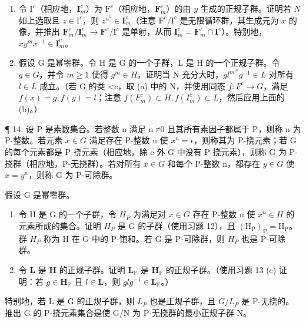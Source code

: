 \begin{enumerate}
\def\labelenumi{(\alph{enumi})}
\setcounter{enumi}{1}
\item
  令 \(\mathrm{I}^c\)（相应地，\(\mathbf{I}_m^c\)）为 \(\mathrm{F}^c\)（相应地，\(\mathbf{F}_m^c\)）的由 \(y\) 生成的正规子群。证明若 \(N\) 如上选取且 \(z \in \mathrm{I}^c\)，则 \(z^{n^k} \in \mathbf{I}_m^c\)（注意 \(\mathrm{F}^c / \mathrm{I}^c\) 是无限循环群，其生成元为 \(x\) 的像，并推出 \(\mathbf{F}_m^c / \mathbf{I}_m^c \to \mathbf{F}^c / \mathrm{I}^c\) 是单射，从而 \(\mathbf{I}_m^c = \mathbf{F}_m^c \cap \mathbf{I}^c\)）。特别地，\(xy^m x^{-1} \in \mathbf{I}_m^c\)。
\item
  假设 G 是幂零群。令 H 是 G 的一个子群，L 是 H 的一个正规子群。令 \(g \in G\)，并令 \(m \geqslant 1\) 使得 \(g^{m} \in H\)。证明当 N 充分大时，\(gl^{m^{N}} g^{-1} \in L\) 对所有 \(l \in L\) 成立。（若 G 的类 \textless c，取 (a) 中的 N，并使用同态 \(f: F^{c} \to G\)，满足 \(f(x) = g, f(y) = l\)；注意 \(f(F_{m}^{c}) \subset H, f(I_{m}^{c}) \subset L\)，然后应用上面的 (b)。）
\end{enumerate}

¶ 14. 设 P 是素数集合。若整数 n 满足 n ≠0 且其所有素因子都属于 P，则称 n 为 P-整数。若元素 \(x \in G\) 满足存在 P-整数 n 使 \(x^{n} = \epsilon\)，则称其为 P-挠元素；若 G 的每个元素都是 P-挠元素（相应地，除 e 外 G 中没有 P-挠元素），则称 G 为 P-挠群（相应地，P-无挠群）。若对所有 \(x \in G\) 和每个 P-整数 n，都存在 \(y \in G\) 使 \(x = y^{n}\)，则称 G 为 P-可除群。

假设 G 是幂零群。

\begin{enumerate}
\def\labelenumi{(\alph{enumi})}
\item
  令 H 是 G 的一个子群，令 \(H_{P}\) 为满足对 \(x \in G\) 存在 P-整数 n 使 \(x^{n} \in H\) 的元素所成的集合。证明 \(H_{P}\) 是 G 的子群（使用习题 12），且 \((\mathrm{H}_{\mathrm{P}})_{\mathrm{P}} = \mathrm{H}_{\mathrm{P}}\)。群 \(H_{P}\) 称为 H 在 G 中的 P-饱和。若 G 是 P-可除群，则 \(H_{P}\) 也是 P-可除群。
\item
  令 \(\mathbf{L}\) 是 \(\mathbf{H}\) 的正规子群。证明 \(\mathbf{L}_{\mathbb{P}}\) 是 \(\mathbf{H}_{\mathbb{P}}\) 的正规子群。（使用习题 13 (c) 证明：若 \(g \in \mathbf{H}_{\mathbb{P}}\) 且 \(l \in \mathbf{L}\)，则 \(glg^{-1} \in \mathbf{L}_{\mathbb{P}}\)。）
\end{enumerate}

特别地，若 L 是 G 的正规子群，则 \(L_{P}\) 也是正规子群，且 \(G/L_{P}\) 是 P-无挠的。推出 G 的 P-挠元素集合是使 G/N 为 P-无挠群的最小正规子群 N。

